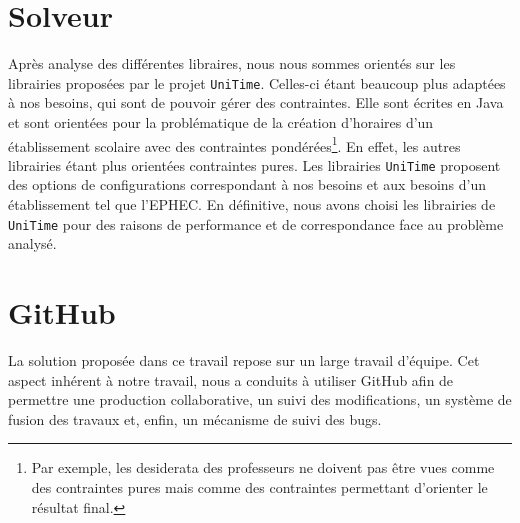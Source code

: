\section{Solveur}

Après analyse des différentes libraires, nous nous sommes orientés sur les
librairies proposées par le projet \texttt{UniTime}. Celles-ci étant beaucoup plus adaptées à nos besoins, qui sont de pouvoir gérer des contraintes. 
\newline
\indent
Elle sont écrites en Java et sont orientées pour la problématique de la création d'horaires d'un établissement scolaire avec des contraintes pondérées\footnote{Par exemple, les desiderata des professeurs ne doivent pas être vues comme des contraintes pures mais comme des contraintes permettant d'orienter le résultat final.}. En effet, les autres librairies étant plus orientées contraintes pures.
\newline
\indent
Les librairies \texttt{UniTime} proposent des options de configurations correspondant à nos besoins et aux besoins d'un établissement tel que l'EPHEC. 
\newline
\indent
En définitive, nous avons choisi les librairies de \texttt{UniTime} pour des raisons de performance et de correspondance face au problème analysé.

\section{GitHub}

La solution proposée dans ce travail repose sur un large travail d'équipe. Cet aspect inhérent à notre travail, nous a conduits à utiliser GitHub afin de permettre une production collaborative, un suivi des modifications, un système de fusion des travaux et, enfin, un mécanisme de suivi des bugs. 


